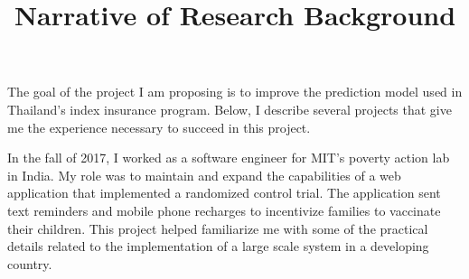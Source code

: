 \documentclass[12pt]{article}
\title{Narrative of Research Background\vspace{-10ex}}
\date{}
\begin{document}
The goal of the project I am proposing is to improve the prediction model used in Thailand's index insurance program. Below, I describe several  projects that give me the experience necessary to succeed in this project. 

In the fall of 2017, I worked as a software engineer for MIT’s poverty action lab in India. My role was to maintain and expand the capabilities of a web application that implemented a randomized control trial. The application sent text reminders and mobile phone recharges to incentivize families to vaccinate their children. This project helped familiarize me with some of the practical details related to the implementation of a large scale system in a developing country.

\end{document}

